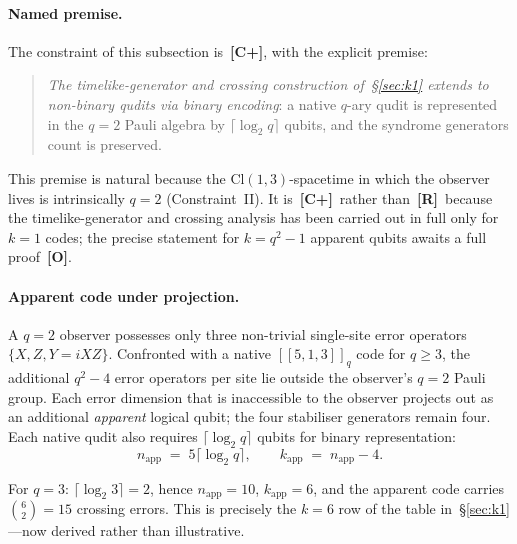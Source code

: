 \documentclass[11pt,a4paper]{article}
\newcommand{\Rmark}{\textcolor{green!50!black}{\textbf{[R]}}}
\newcommand{\Cpmark}{\textcolor{blue!70!black}{\textbf{[C+]}}}
\newcommand{\Omark}{\textcolor{red!60!black}{\textbf{[O]}}}
\newcommand{\Cq}[4]{[\![#1,#2,#3]\!]_{#4}}
\providecommand{\Cl}[1]{\mathrm{Cl}(#1)}
\newcommand{\nApp}{n_{\mathrm{app}}}
\newcommand{\kApp}{k_{\mathrm{app}}}
\begin{document}
\paragraph{Named premise.} The constraint of this subsection is~\Cpmark, with the explicit premise:
\begin{quote}
\emph{The timelike-generator and crossing construction of~\S\ref{sec:k1} extends to non-binary qudits via binary encoding}: a native $q$-ary qudit is represented in the $q=2$ Pauli algebra by $\lceil\log_2 q\rceil$ qubits, and the syndrome generators count is preserved.
\end{quote}
This premise is natural because the $\Cl{1,3}$-spacetime in which the observer lives is intrinsically $q=2$ (Constraint~II). It is~\Cpmark\ rather than~\Rmark\ because the timelike-generator and crossing analysis has been carried out in full only for $k=1$ codes; the precise statement for $k=q^2-1$ apparent qubits awaits a full proof~\Omark.

\paragraph{Apparent code under projection.} A $q=2$ observer possesses only three non-trivial single-site error operators $\{X,Z,Y=iXZ\}$. Confronted with a native $\Cq{5}{1}{3}{q}$ code for $q\geq3$, the additional $q^2-4$ error operators per site lie outside the observer's $q=2$ Pauli group. Each error dimension that is inaccessible to the observer projects out as an additional \emph{apparent} logical qubit; the four stabiliser generators remain four. Each native qudit also requires $\lceil\log_2 q\rceil$ qubits for binary representation:
\begin{equation}
  \nApp \;=\; 5\lceil\log_2 q\rceil,
  \qquad
  \kApp \;=\; \nApp - 4.
  \label{eq:apparent}
\end{equation}

For $q=3$: $\lceil\log_2 3\rceil = 2$, hence $\nApp = 10$, $\kApp = 6$, and the apparent code carries $\binom{6}{2} = 15$ crossing errors. This is precisely the $k=6$ row of the table in~\S\ref{sec:k1}---now derived rather than illustrative.
\end{document}
